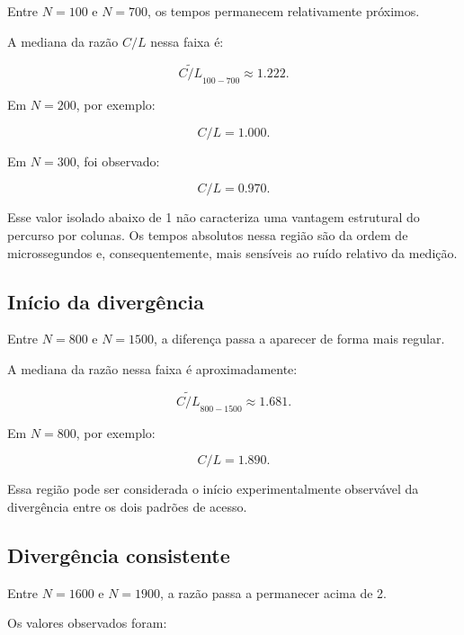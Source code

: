 Entre \(N=100\) e \(N=700\), os tempos permanecem relativamente próximos.

A mediana da razão \(C/L\) nessa faixa é:

\begin{equation}
    \widetilde{C/L}_{100-700}
    \approx
    1.222.
\end{equation}

Em \(N=200\), por exemplo:

\begin{equation}
    C/L = 1.000.
\end{equation}

Em \(N=300\), foi observado:

\begin{equation}
    C/L = 0.970.
\end{equation}

Esse valor isolado abaixo de 1 não caracteriza uma vantagem estrutural do
percurso por colunas. Os tempos absolutos nessa região são da ordem de
microssegundos e, consequentemente, mais sensíveis ao ruído relativo da
medição.


\subsection{Início da divergência}

Entre \(N=800\) e \(N=1500\), a diferença passa a aparecer de forma mais
regular.

A mediana da razão nessa faixa é aproximadamente:

\begin{equation}
    \widetilde{C/L}_{800-1500}
    \approx
    1.681.
\end{equation}

Em \(N=800\), por exemplo:

\begin{equation}
    C/L = 1.890.
\end{equation}

Essa região pode ser considerada o início experimentalmente observável da
divergência entre os dois padrões de acesso.


\subsection{Divergência consistente}

Entre \(N=1600\) e \(N=1900\), a razão passa a permanecer acima de 2.

Os valores observados foram:

